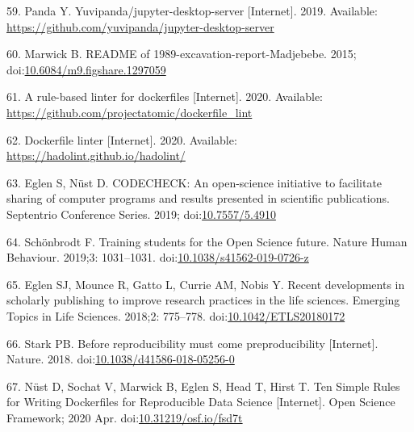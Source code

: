 \documentclass[10pt,letterpaper]{article}
\begin{document}
\leavevmode\hypertarget{ref-yuvipanda_jupyter-desktop-server_2019}{}%
59. Panda Y. Yuvipanda/jupyter-desktop-server {[}Internet{]}. 2019.
Available: \url{https://github.com/yuvipanda/jupyter-desktop-server}

\leavevmode\hypertarget{ref-marwick_readme_2015}{}%
60. Marwick B. README of 1989-excavation-report-Madjebebe. 2015;
doi:\href{https://doi.org/10.6084/m9.figshare.1297059}{10.6084/m9.figshare.1297059}

\leavevmode\hypertarget{ref-dockerfile-lint}{}%
61. A rule-based linter for dockerfiles {[}Internet{]}. 2020. Available:
\url{https://github.com/projectatomic/dockerfile_lint}

\leavevmode\hypertarget{ref-hadolint}{}%
62. Dockerfile linter {[}Internet{]}. 2020. Available:
\url{https://hadolint.github.io/hadolint/}

\leavevmode\hypertarget{ref-eglen_codecheck_2019}{}%
63. Eglen S, Nüst D. CODECHECK: An open-science initiative to facilitate
sharing of computer programs and results presented in scientific
publications. Septentrio Conference Series. 2019;
doi:\href{https://doi.org/10.7557/5.4910}{10.7557/5.4910}

\leavevmode\hypertarget{ref-schonbrodt_training_2019}{}%
64. Schönbrodt F. Training students for the Open Science future. Nature
Human Behaviour. 2019;3: 1031--1031.
doi:\href{https://doi.org/10.1038/s41562-019-0726-z}{10.1038/s41562-019-0726-z}

\leavevmode\hypertarget{ref-eglen_recent_2018}{}%
65. Eglen SJ, Mounce R, Gatto L, Currie AM, Nobis Y. Recent developments
in scholarly publishing to improve research practices in the life
sciences. Emerging Topics in Life Sciences. 2018;2: 775--778.
doi:\href{https://doi.org/10.1042/ETLS20180172}{10.1042/ETLS20180172}

\leavevmode\hypertarget{ref-stark_before_2018}{}%
66. Stark PB. Before reproducibility must come preproducibility
{[}Internet{]}. Nature. 2018.
doi:\href{https://doi.org/10.1038/d41586-018-05256-0}{10.1038/d41586-018-05256-0}

\leavevmode\hypertarget{ref-nust_ten_2020}{}%
67. Nüst D, Sochat V, Marwick B, Eglen S, Head T, Hirst T. Ten Simple
Rules for Writing Dockerfiles for Reproducible Data Science
{[}Internet{]}. Open Science Framework; 2020 Apr.
doi:\href{https://doi.org/10.31219/osf.io/fsd7t}{10.31219/osf.io/fsd7t}

\nolinenumbers
\end{document}
